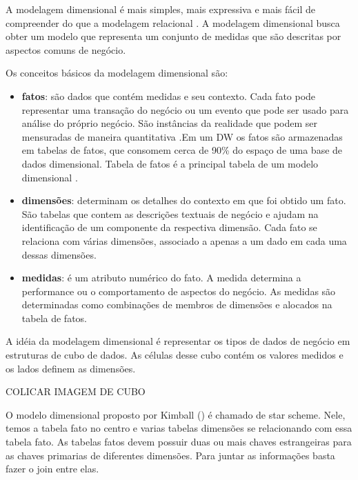 %

A modelagem dimensional é mais simples, mais expressiva e mais fácil de compreender do que a modelagem relacional \cite{ballard1998}. A modelagem dimensional busca obter um modelo que representa um conjunto de medidas que são descritas por aspectos comuns de negócio.

%

Os conceitos básicos da modelagem dimensional são:

\begin{itemize}
	\item \textbf{fatos}: são dados que contém medidas e seu contexto. Cada fato pode representar uma transação do negócio ou um evento que pode ser usado para análise do próprio negócio. São instâncias da realidade  que podem ser mensuradas de maneira quantitativa \cite{kiball2002}.Em um DW os fatos são armazenadas em tabelas de fatos, que consomem cerca de 90\% do espaço de uma base de dados dimensional. Tabela de fatos é a principal tabela de um modelo dimensional \cite{kimball2002} \cite{ballard1998}.
	\item \textbf{dimensões}: determinam os detalhes do contexto em que foi obtido um fato. São tabelas que contem as descrições textuais de negócio e ajudam na identificação de um componente da respectiva dimensão. Cada fato se relaciona com várias dimensões, associado a apenas a um dado em cada uma dessas dimensões.
	\item \textbf{medidas}: é um atributo numérico do fato. A medida determina a performance ou o comportamento de aspectos do negócio. As medidas são determinadas como combinações de membros de dimensões e alocados na tabela de fatos.
\end{itemize}

%

A idéia da modelagem dimensional é representar os tipos de dados de negócio em estruturas de cubo de dados. As células desse cubo contém os valores medidos e os lados definem as dimensões.

COLICAR IMAGEM DE CUBO

%

O modelo dimensional proposto por Kimball (\citeyear{kiball2002}) é chamado de star scheme. Nele, temos a tabela fato no centro e varias tabelas dimensões se relacionando com essa tabela fato. As tabelas fatos devem possuir duas ou mais chaves estrangeiras para as chaves primarias de diferentes dimensões. Para juntar as informações basta fazer o join entre elas.

